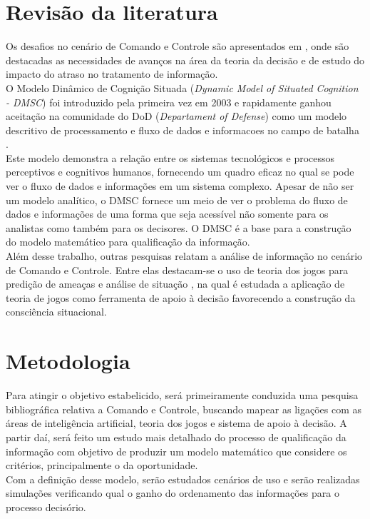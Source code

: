 \documentclass[a4paper,12pt]{article}
\begin{document}
\section{Revisão da literatura}
Os desafios no cenário de Comando e Controle são apresentados em \cite{Athans 1986}, onde são destacadas as necessidades de avanços na área da teoria 
da decisão e de estudo do impacto do atraso no tratamento de informação.\\
\indent O Modelo Dinâmico de Cognição Situada (\textit{Dynamic Model of Situated Cognition - DMSC}) foi introduzido pela primeira vez em 2003 e rapidamente 
ganhou aceitação na comunidade do DoD (\textit {Departament of Defense}) como um modelo descritivo de processamento e fluxo de dados e informacoes no campo de 
batalha \cite{Phillips 2008}.\\
\indent Este modelo demonstra a relação entre os sistemas tecnológicos e processos perceptivos e cognitivos humanos, fornecendo um quadro eficaz no qual se pode
ver o fluxo de dados e informações em um sistema complexo. Apesar de não ser um modelo analítico, o DMSC fornece um meio de ver o problema do fluxo de dados e 
informações de uma forma que seja acessível não somente para os analistas como também para os decisores. O DMSC é a base para a construção do modelo matemático
 para qualificação da informação.\\
\indent Além desse trabalho, outras pesquisas relatam a análise de informação no cenário de Comando e Controle. Entre elas destacam-se o uso de teoria dos 
jogos para predição de ameaças e análise de situação \cite{Brynielsson 2004}, na qual é estudada a aplicação de teoria de jogos como ferramenta de apoio à 
decisão favorecendo a construção da consciência situacional.


\section{Metodologia}
\indent Para atingir o objetivo estabelicido, será primeiramente conduzida uma pesquisa bibliográfica relativa a Comando e Controle, buscando mapear as ligações 
com as áreas de inteligência artificial, teoria dos jogos e sistema de apoio à decisão. A partir daí, será feito um estudo mais 
detalhado do processo de qualificação da informação com objetivo de produzir um modelo matemático que considere os critérios, principalmente o da oportunidade.\\
\indent Com a definição desse modelo, serão estudados cenários de uso e serão realizadas simulações verificando qual o ganho do ordenamento das informações para
 o processo decisório.
\end{document}
